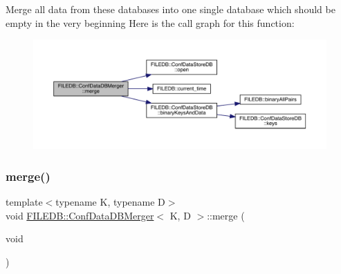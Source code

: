 Merge all data from these databases into one single database which should be empty in the very beginning Here is the call graph for this function\+:
\nopagebreak
\begin{figure}[H]
\begin{center}
\leavevmode
\includegraphics[width=350pt]{db/d60/classFILEDB_1_1ConfDataDBMerger_a6738f9880645518ba94eccd3b2037f24_cgraph}
\end{center}
\end{figure}
\mbox{\label{classFILEDB_1_1ConfDataDBMerger_a6738f9880645518ba94eccd3b2037f24}} 
\subsubsection{\texorpdfstring{merge()}{merge()}\hspace{0.1cm}{\footnotesize\ttfamily [3/3]}}
{\footnotesize\ttfamily template$<$typename K, typename D$>$ \\
void \mbox{\hyperlink{classFILEDB_1_1ConfDataDBMerger}{F\+I\+L\+E\+D\+B\+::\+Conf\+Data\+D\+B\+Merger}}$<$ K, D $>$\+::merge (\begin{DoxyParamCaption}\item[{void}]{ }\end{DoxyParamCaption})\hspace{0.3cm}{\ttfamily [inline]}}

